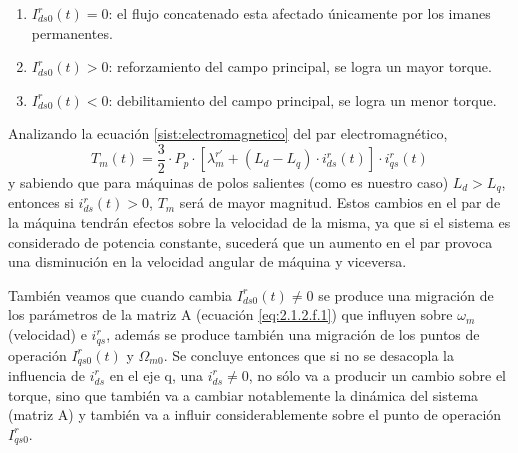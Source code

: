 \documentclass[10pt]{article}
\begin{document}
\begin{enumerate}
	\begin{enumerate}
	\item $I^{r}_{ds0}(t)=0$: el flujo concatenado esta afectado únicamente por los imanes permanentes.
	\item $I^{r}_{ds0}(t)>0$: reforzamiento del campo principal, se logra un mayor torque.
	\item $I^{r}_{ds0}(t)<0$: debilitamiento del campo principal, se logra un menor torque.
	\end{enumerate}
	
	Analizando la ecuación \ref{sist:electromagnetico} del par electromagnético,
	\begin{equation}
		T_{m}\left ( t \right )=\frac{3}{2} \cdot P_{p} \cdot \left [ \lambda_{m}^{r'}+\left ( L_{d}-L_{q} \right )\cdot i_{ds}^{r} \left ( t \right ) \right ] \cdot i_{qs}^{r}\left ( t \right )
	\end{equation}
	y sabiendo que para máquinas de polos salientes (como es nuestro caso) $L_d > L_q$, entonces si $i_{ds}^{r}(t) > 0$, $T_m$ será de mayor magnitud.
	Estos cambios en el par de la máquina tendrán efectos sobre la velocidad de la misma, ya que si el sistema es considerado de potencia constante, sucederá que un aumento en el par provoca una disminución en la velocidad angular de máquina y viceversa.

	También veamos que cuando cambia $I^{r}_{ds0}(t)\neq 0$ se produce una migración de los parámetros de la matriz A (ecuación \ref{eq:2.1.2.f.1}) que influyen sobre $\omega_{m}$ (velocidad) e $i^{r}_{qs}$, además se produce también una migración de los puntos de operación $I^{r}_{qs0}(t)$ y $\Omega_{m0}$.
	Se concluye entonces que si no se desacopla la influencia de $i^{r}_{ds}$ en el eje q, una $i^{r}_{ds}\neq 0$, no sólo va a producir un cambio sobre el torque, sino que también va a cambiar notablemente la dinámica del sistema (matriz A) y también va a influir considerablemente sobre el punto de operación $I^{r}_{qs0}$.\\


\end{enumerate}
\end{document}
